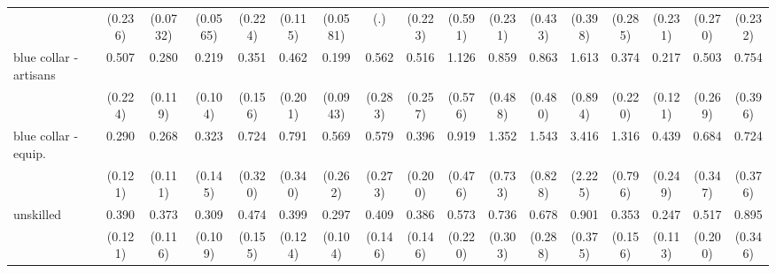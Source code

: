 {\begin{tabular}{l*{16}{c}}
                    &     (0.236)         &    (0.0732)         &    (0.0565)         &     (0.224)         &     (0.115)         &    (0.0581)         &         (.)         &     (0.223)         &     (0.591)         &     (0.231)         &     (0.433)         &     (0.398)         &     (0.285)         &     (0.231)         &     (0.270)         &     (0.232)         \\
[1em]
blue collar - artisans&       0.507         &       0.280\sym{**} &       0.219\sym{**} &       0.351\sym{*}  &       0.462         &       0.199\sym{***}&       0.562         &       0.516         &       1.126         &       0.859         &       0.863         &       1.613         &       0.374         &       0.217\sym{**} &       0.503         &       0.754         \\
                    &     (0.224)         &     (0.119)         &     (0.104)         &     (0.156)         &     (0.201)         &    (0.0943)         &     (0.283)         &     (0.257)         &     (0.576)         &     (0.488)         &     (0.480)         &     (0.894)         &     (0.220)         &     (0.121)         &     (0.269)         &     (0.396)         \\
[1em]
blue collar - equip.&       0.290\sym{**} &       0.268\sym{**} &       0.323\sym{*}  &       0.724         &       0.791         &       0.569         &       0.579         &       0.396         &       0.919         &       1.352         &       1.543         &       3.416         &       1.316         &       0.439         &       0.684         &       0.724         \\
                    &     (0.121)         &     (0.111)         &     (0.145)         &     (0.320)         &     (0.340)         &     (0.262)         &     (0.273)         &     (0.200)         &     (0.476)         &     (0.733)         &     (0.828)         &     (2.225)         &     (0.796)         &     (0.249)         &     (0.347)         &     (0.376)         \\
[1em]
unskilled           &       0.390\sym{**} &       0.373\sym{**} &       0.309\sym{***}&       0.474\sym{*}  &       0.399\sym{**} &       0.297\sym{***}&       0.409\sym{*}  &       0.386\sym{*}  &       0.573         &       0.736         &       0.678         &       0.901         &       0.353\sym{*}  &       0.247\sym{**} &       0.517         &       0.895         \\
                    &     (0.121)         &     (0.116)         &     (0.109)         &     (0.155)         &     (0.124)         &     (0.104)         &     (0.146)         &     (0.146)         &     (0.220)         &     (0.303)         &     (0.288)         &     (0.375)         &     (0.156)         &     (0.113)         &     (0.200)         &     (0.346)         \\

\end{tabular}}
